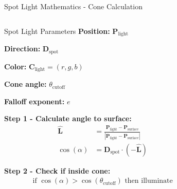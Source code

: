 \begin{frame}{Spot Light Mathematics - Cone Calculation}
  \begin{columns}
    \begin{column}{0.7\textwidth}
      \begin{mathbox}{Spot Light Parameters}
        \textbf{Position:} $\mathbf{P}_{\text{light}}$

        \textbf{Direction:} $\mathbf{D}_{\text{spot}}$

        \textbf{Color:} $\mathbf{C}_{\text{light}} = (r, g, b)$

        \textbf{Cone angle:} $\theta_{\text{cutoff}}$

        \textbf{Falloff exponent:} $e$

        \vspace{0.3cm}
        \pause
        \textbf{Step 1 - Calculate angle to surface:}
        \begin{align*}
          \hat{\mathbf{L}} &= \frac{\mathbf{P}_{\text{light}} - \mathbf{P}_{\text{surface}}}
          {|\mathbf{P}_{\text{light}} - \mathbf{P}_{\text{surface}}|} \\
          \cos(\alpha) &=  \mathbf{D}_{\text{spot}} \cdot (- \hat{\mathbf{L}})
        \end{align*}

        \pause
        \textbf{Step 2 - Check if inside cone:}
        \begin{align*}
          \text{if } \cos(\alpha) > \cos(\theta_{\text{cutoff}}) \text{ then illuminate}
        \end{align*}
      \end{mathbox}
    \end{column}
    \begin{column}{0.3\textwidth}
\end{column}
\end{columns}
\end{frame}
